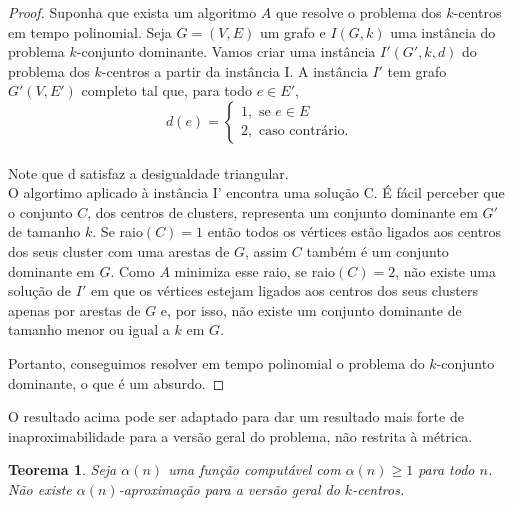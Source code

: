 \documentclass[12pt]{article}
\newtheorem{theorem}{Teorema}[section]
\begin{document}
\begin{proof}
    Suponha que exista um algoritmo $A$ que resolve o problema dos $k$-centros em tempo polinomial. Seja $G = (V,E)$ um grafo e $I(G,k)$ uma instância do problema $k$-conjunto dominante. Vamos criar uma instância $I'(G',k,d)$ do problema dos $k$-centros a partir da instância I. A instância $I'$ tem grafo $G'(V,E')$ completo tal que, para todo $e \in E'$, \\
    \[
    d(e) = \begin{cases}
            1, \text{ se } e \in E \\
            2, \text{ caso contrário.} 
            \end{cases}\]\\
    Note que d satisfaz a desigualdade triangular.\\
    O algortimo aplicado à instância I' encontra uma solução C. É fácil perceber que o conjunto $C$, dos centros de clusters, representa um conjunto dominante em $G'$ de tamanho $k$. Se raio$(C)=1$ então todos os vértices estão ligados aos centros dos seus cluster com uma arestas de $G$, assim $C$ também é um conjunto dominante em $G$. Como $A$ minimiza esse raio, se raio$(C)=2$, não existe uma solução de $I'$ em que os vértices estejam ligados aos centros dos seus clusters apenas por arestas de $G$ e, por isso, não existe um conjunto dominante de tamanho menor ou igual a $k$ em $G$.

    Portanto, conseguimos resolver em tempo polinomial o problema do $k$-conjunto dominante, o que é um absurdo.
\end{proof}

O resultado acima pode ser adaptado para dar um resultado mais forte de inaproximabilidade para a versão geral do problema, não restrita à métrica.
\begin{theorem}
    Seja $\alpha(n)$ uma função computável com $\alpha(n)\geq 1$ para todo $n$. Não existe $\alpha(n)$-aproximação para a versão geral do $k$-centros.
\end{theorem}
\end{document}
